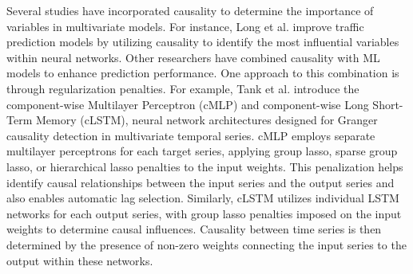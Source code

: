 \documentclass[acmsmall]{acmart}
\begin{document}
{\color{black}Several} studies have incorporated causality to determine the importance of variables in multivariate models. For instance, Long et al. \cite{long2021air} improve traffic prediction models by utilizing causality to identify the most influential variables within neural networks. Other researchers have combined causality with ML models to enhance prediction performance. {\color{black}One approach to this combination is through regularization penalties.} For example, Tank et al. \cite{tank2021neural} introduce the component-wise Multilayer Perceptron (cMLP) and component-wise Long Short-Term Memory (cLSTM), neural network architectures designed for Granger causality detection in multivariate temporal series. cMLP employs separate multilayer perceptrons for each target series, applying group lasso, sparse group lasso, or hierarchical lasso penalties to the input weights. This penalization helps identify causal relationships between the input series and the output series and also enables automatic lag selection. Similarly, cLSTM utilizes individual LSTM networks for each output series, with group lasso penalties imposed on the input weights to determine causal influences. Causality between time series is then determined by the presence of non-zero weights connecting the input series to the output within these networks. 


\end{document}
